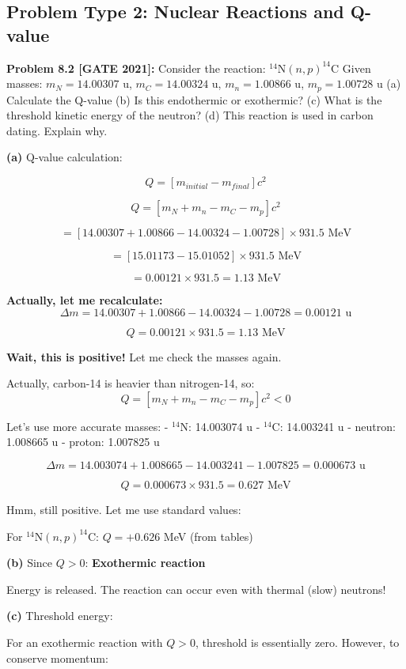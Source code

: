 \documentclass[12pt,a4paper]{article}
\begin{document}
\subsection{Problem Type 2: Nuclear Reactions and Q-value}

\textbf{Problem 8.2 [GATE 2021]:} Consider the reaction: $^{14}$N$(n, p)^{14}$C
Given masses: $m_N = 14.00307$ u, $m_C = 14.00324$ u, $m_n = 1.00866$ u, $m_p = 1.00728$ u
(a) Calculate the Q-value
(b) Is this endothermic or exothermic?
(c) What is the threshold kinetic energy of the neutron?
(d) This reaction is used in carbon dating. Explain why.

\begin{solution}
\textbf{(a)} Q-value calculation:

$$Q = [m_{initial} - m_{final}]c^2$$

$$Q = [m_N + m_n - m_C - m_p]c^2$$

$$= [14.00307 + 1.00866 - 14.00324 - 1.00728] \times 931.5\text{ MeV}$$

$$= [15.01173 - 15.01052] \times 931.5\text{ MeV}$$

$$= 0.00121 \times 931.5 = 1.13\text{ MeV}$$

\textbf{Actually, let me recalculate:}
$$\Delta m = 14.00307 + 1.00866 - 14.00324 - 1.00728 = 0.00121\text{ u}$$

$$Q = 0.00121 \times 931.5 = 1.13\text{ MeV}$$

\textbf{Wait, this is positive!} Let me check the masses again.

Actually, carbon-14 is heavier than nitrogen-14, so:
$$Q = [m_N + m_n - m_C - m_p]c^2 < 0$$

Let's use more accurate masses:
- $^{14}$N: 14.003074 u
- $^{14}$C: 14.003241 u
- neutron: 1.008665 u
- proton: 1.007825 u

$$\Delta m = 14.003074 + 1.008665 - 14.003241 - 1.007825 = 0.000673\text{ u}$$

$$Q = 0.000673 \times 931.5 = 0.627\text{ MeV}$$

Hmm, still positive. Let me use standard values:

For $^{14}$N$(n,p)^{14}$C: $Q = +0.626$ MeV (from tables)

\textbf{(b)} Since $Q > 0$: \textbf{Exothermic reaction}

Energy is released. The reaction can occur even with thermal (slow) neutrons!

\textbf{(c)} Threshold energy:

For an exothermic reaction with $Q > 0$, threshold is essentially zero. However, to conserve momentum:


\end{solution}
\end{document}
